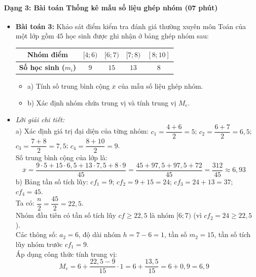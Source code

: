 \documentclass[12pt, a4paper]{article}
\begin{document}
\paragraph{Dạng 3: Bài toán Thống kê mẫu số liệu ghép nhóm (07 phút)}
\begin{itemize}
    \item \textbf{Bài toán 3:} Khảo sát điểm kiểm tra đánh giá thường xuyên môn Toán của một lớp gồm $45$ học sinh được ghi nhận ở bảng ghép nhóm sau:
    \begin{center}
    \begin{tabular}{|c|c|c|c|c|}
    \hline
    \textbf{Nhóm điểm} & $[4; 6)$ & $[6; 7)$ & $[7; 8)$ & $[8; 10]$ \\
    \hline
    \textbf{Số học sinh ($m_i$)} & $9$ & $15$ & $13$ & $8$ \\
    \hline
    \end{tabular}
    \end{center}
    \begin{itemize}
        \item a) Tính số trung bình cộng $\overline{x}$ của mẫu số liệu ghép nhóm.
        \item b) Xác định nhóm chứa trung vị và tính trung vị $M_e$.
    \end{itemize}
    \item \textit{Lời giải chi tiết:}\\
    a) Xác định giá trị đại diện của từng nhóm:
    $c_1 = \dfrac{4 + 6}{2} = 5$; $c_2 = \dfrac{6 + 7}{2} = 6{,}5$; $c_3 = \dfrac{7 + 8}{2} = 7{,}5$; $c_4 = \dfrac{8 + 10}{2} = 9$.\\
    Số trung bình cộng của lớp là:
    $$\overline{x} = \dfrac{9 \cdot 5 + 15 \cdot 6{,}5 + 13 \cdot 7{,}5 + 8 \cdot 9}{45} = \dfrac{45 + 97{,}5 + 97{,}5 + 72}{45} = \dfrac{312}{45} \approx 6{,}93$$
    b) Bảng tần số tích lũy: $cf_1 = 9$; $cf_2 = 9 + 15 = 24$; $cf_3 = 24 + 13 = 37$; $cf_4 = 45$.\\
    Ta có: $\dfrac{n}{2} = \dfrac{45}{2} = 22{,}5$.\\
    Nhóm đầu tiên có tần số tích lũy $cf \ge 22{,}5$ là nhóm $[6; 7)$ (vì $cf_2 = 24 \ge 22{,}5$).\\
    Các thông số: $a_2 = 6$, độ dài nhóm $h = 7 - 6 = 1$, tần số $m_2 = 15$, tần số tích lũy nhóm trước $cf_1 = 9$.\\
    Áp dụng công thức tính trung vị:
    $$M_e = 6 + \dfrac{22{,}5 - 9}{15} \cdot 1 = 6 + \dfrac{13{,}5}{15} = 6 + 0{,}9 = 6{,}9$$
\end{itemize}
\end{document}
